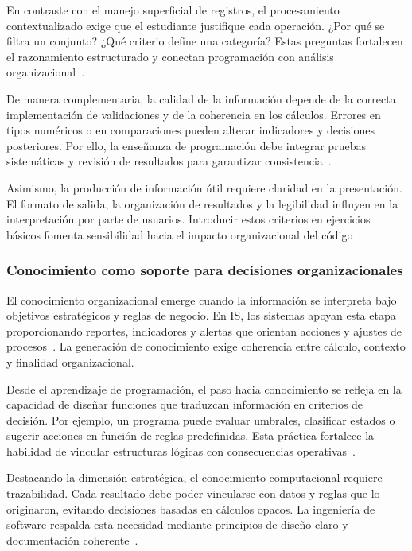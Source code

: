 \documentclass[12pt,twoside]{book}
\begin{document}
						En contraste con el manejo superficial de registros, el procesamiento contextualizado exige que el estudiante justifique cada operación. ¿Por qué se filtra un conjunto? ¿Qué criterio define una categoría? Estas preguntas fortalecen el razonamiento estructurado y conectan programación con análisis organizacional~\cite{Kendall2014Systems,Tegarden2025Systems,Laudon2020Management}.
						
						De manera complementaria, la calidad de la información depende de la correcta implementación de validaciones y de la coherencia en los cálculos. Errores en tipos numéricos o en comparaciones pueden alterar indicadores y decisiones posteriores. Por ello, la enseñanza de programación debe integrar pruebas sistemáticas y revisión de resultados para garantizar consistencia~\cite{IEEE2019Standard754,Goldberg1991What,Ghezzi2003Fundamentals}.
						
						Asimismo, la producción de información útil requiere claridad en la presentación. El formato de salida, la organización de resultados y la legibilidad influyen en la interpretación por parte de usuarios. Introducir estos criterios en ejercicios básicos fomenta sensibilidad hacia el impacto organizacional del código~\cite{Dix2004HCI,Laudon2020Management,Kendall2014Systems}.
						
					\subsubsection{Conocimiento como soporte para decisiones organizacionales}
						\noindent
						El conocimiento organizacional emerge cuando la información se interpreta bajo objetivos estratégicos y reglas de negocio. En IS, los sistemas apoyan esta etapa proporcionando reportes, indicadores y alertas que orientan acciones y ajustes de procesos~\cite{Laudon2020Management,Calzati2025Ecosystemic,Bernstein2009Data}. La generación de conocimiento exige coherencia entre cálculo, contexto y finalidad organizacional.
						
						Desde el aprendizaje de programación, el paso hacia conocimiento se refleja en la capacidad de diseñar funciones que traduzcan información en criterios de decisión. Por ejemplo, un programa puede evaluar umbrales, clasificar estados o sugerir acciones en función de reglas predefinidas. Esta práctica fortalece la habilidad de vincular estructuras lógicas con consecuencias operativas~\cite{Hanly2015Problem,Wirth1976Algorithms,Gaddis2022Starting}.
						
						Destacando la dimensión estratégica, el conocimiento computacional requiere trazabilidad. Cada resultado debe poder vincularse con datos y reglas que lo originaron, evitando decisiones basadas en cálculos opacos. La ingeniería de software respalda esta necesidad mediante principios de diseño claro y documentación coherente~\cite{Ghezzi2003Fundamentals,Sommerville2015Software,Kendall2014Systems}.
						
\end{document}
